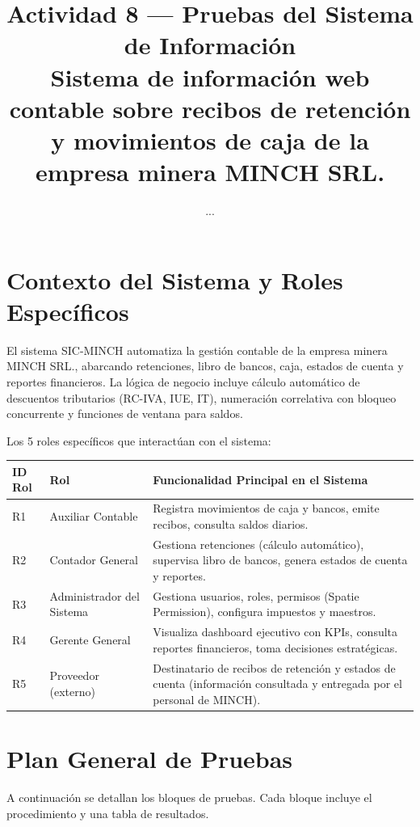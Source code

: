 \documentclass[stu]{apa7}
\title{Actividad 8 --- Pruebas del Sistema de Información \\ Sistema de información web contable sobre recibos de retención y movimientos de caja de la empresa minera MINCH SRL.}
\author{...}
\affiliation{...}
\begin{document}
\maketitle

\section{Contexto del Sistema y Roles Específicos}

El sistema SIC-MINCH automatiza la gestión contable de la empresa minera MINCH SRL., abarcando retenciones, libro de bancos, caja, estados de cuenta y reportes financieros. La lógica de negocio incluye cálculo automático de descuentos tributarios (RC-IVA, IUE, IT), numeración correlativa con bloqueo concurrente y funciones de ventana para saldos.

Los 5 roles específicos que interactúan con el sistema:

\begin{longtable}{|C{1.5cm}|L{3cm}|L{9cm}|}
\hline
{}
\textbf{ID Rol} & \textbf{Rol} & \textbf{Funcionalidad Principal en el Sistema} \\
\hline
R1 & Auxiliar Contable & Registra movimientos de caja y bancos, emite recibos, consulta saldos diarios. \\
\hline
R2 & Contador General & Gestiona retenciones (cálculo automático), supervisa libro de bancos, genera estados de cuenta y reportes. \\
\hline
R3 & Administrador del Sistema & Gestiona usuarios, roles, permisos (Spatie Permission), configura impuestos y maestros. \\
\hline
R4 & Gerente General & Visualiza dashboard ejecutivo con KPIs, consulta reportes financieros, toma decisiones estratégicas. \\
\hline
R5 & Proveedor (externo) & Destinatario de recibos de retención y estados de cuenta (información consultada y entregada por el personal de MINCH). \\
\hline
\end{longtable}

\section{Plan General de Pruebas}

A continuación se detallan los bloques de pruebas. Cada bloque incluye el procedimiento y una tabla de resultados.
\end{document}
